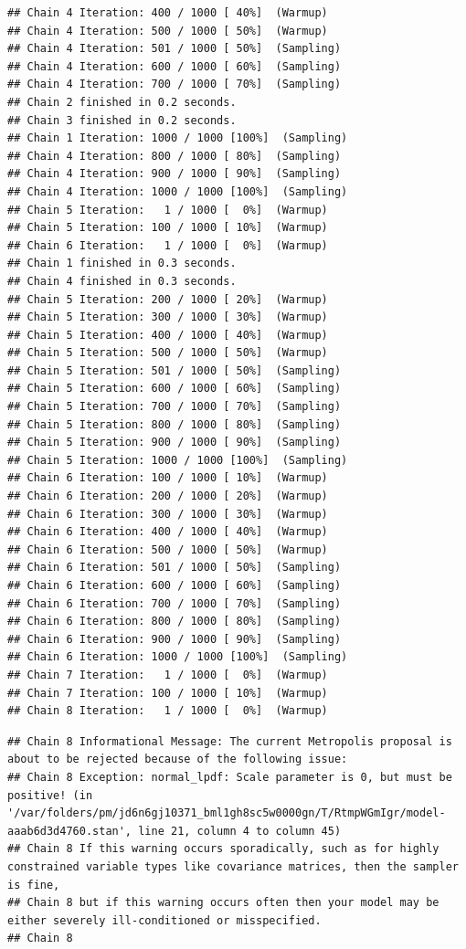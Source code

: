 \documentclass[
]{book}
\begin{document}
\begin{verbatim}
## Chain 4 Iteration: 400 / 1000 [ 40%]  (Warmup) 
## Chain 4 Iteration: 500 / 1000 [ 50%]  (Warmup) 
## Chain 4 Iteration: 501 / 1000 [ 50%]  (Sampling) 
## Chain 4 Iteration: 600 / 1000 [ 60%]  (Sampling) 
## Chain 4 Iteration: 700 / 1000 [ 70%]  (Sampling) 
## Chain 2 finished in 0.2 seconds.
## Chain 3 finished in 0.2 seconds.
## Chain 1 Iteration: 1000 / 1000 [100%]  (Sampling) 
## Chain 4 Iteration: 800 / 1000 [ 80%]  (Sampling) 
## Chain 4 Iteration: 900 / 1000 [ 90%]  (Sampling) 
## Chain 4 Iteration: 1000 / 1000 [100%]  (Sampling) 
## Chain 5 Iteration:   1 / 1000 [  0%]  (Warmup) 
## Chain 5 Iteration: 100 / 1000 [ 10%]  (Warmup) 
## Chain 6 Iteration:   1 / 1000 [  0%]  (Warmup) 
## Chain 1 finished in 0.3 seconds.
## Chain 4 finished in 0.3 seconds.
## Chain 5 Iteration: 200 / 1000 [ 20%]  (Warmup) 
## Chain 5 Iteration: 300 / 1000 [ 30%]  (Warmup) 
## Chain 5 Iteration: 400 / 1000 [ 40%]  (Warmup) 
## Chain 5 Iteration: 500 / 1000 [ 50%]  (Warmup) 
## Chain 5 Iteration: 501 / 1000 [ 50%]  (Sampling) 
## Chain 5 Iteration: 600 / 1000 [ 60%]  (Sampling) 
## Chain 5 Iteration: 700 / 1000 [ 70%]  (Sampling) 
## Chain 5 Iteration: 800 / 1000 [ 80%]  (Sampling) 
## Chain 5 Iteration: 900 / 1000 [ 90%]  (Sampling) 
## Chain 5 Iteration: 1000 / 1000 [100%]  (Sampling) 
## Chain 6 Iteration: 100 / 1000 [ 10%]  (Warmup) 
## Chain 6 Iteration: 200 / 1000 [ 20%]  (Warmup) 
## Chain 6 Iteration: 300 / 1000 [ 30%]  (Warmup) 
## Chain 6 Iteration: 400 / 1000 [ 40%]  (Warmup) 
## Chain 6 Iteration: 500 / 1000 [ 50%]  (Warmup) 
## Chain 6 Iteration: 501 / 1000 [ 50%]  (Sampling) 
## Chain 6 Iteration: 600 / 1000 [ 60%]  (Sampling) 
## Chain 6 Iteration: 700 / 1000 [ 70%]  (Sampling) 
## Chain 6 Iteration: 800 / 1000 [ 80%]  (Sampling) 
## Chain 6 Iteration: 900 / 1000 [ 90%]  (Sampling) 
## Chain 6 Iteration: 1000 / 1000 [100%]  (Sampling) 
## Chain 7 Iteration:   1 / 1000 [  0%]  (Warmup) 
## Chain 7 Iteration: 100 / 1000 [ 10%]  (Warmup) 
## Chain 8 Iteration:   1 / 1000 [  0%]  (Warmup)
\end{verbatim}

\begin{verbatim}
## Chain 8 Informational Message: The current Metropolis proposal is about to be rejected because of the following issue:
## Chain 8 Exception: normal_lpdf: Scale parameter is 0, but must be positive! (in '/var/folders/pm/jd6n6gj10371_bml1gh8sc5w0000gn/T/RtmpWGmIgr/model-aaab6d3d4760.stan', line 21, column 4 to column 45)
## Chain 8 If this warning occurs sporadically, such as for highly constrained variable types like covariance matrices, then the sampler is fine,
## Chain 8 but if this warning occurs often then your model may be either severely ill-conditioned or misspecified.
## Chain 8
\end{verbatim}
\end{document}
